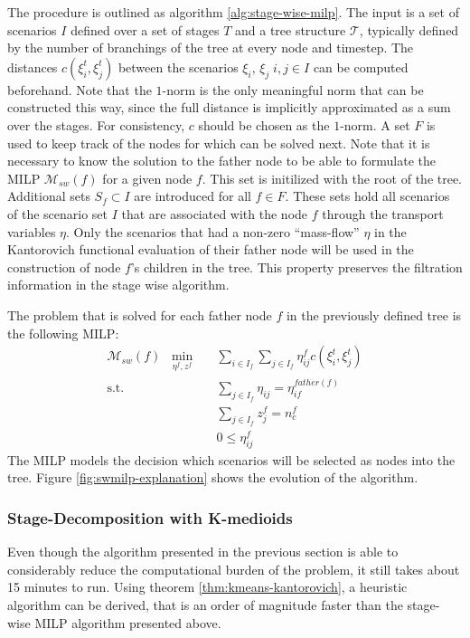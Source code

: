 The procedure is outlined as algorithm \ref{alg:stage-wise-milp}.
The input is a set of scenarios $I$ defined over a set of stages $T$ and a tree structure $\mathcal{T}$, typically defined by the number of branchings of the tree at every node and timestep.
The distances $c(\xi_i^t, \xi_j^t)$ between the scenarios $\xi_i,\,\xi_j\; i,j\in I$ can be computed beforehand.
Note that the $1$-norm is the only meaningful norm that can be constructed this way, since the full distance is implicitly approximated as a sum over the stages.
For consistency, $c$ should be chosen as the $1$-norm.
A set $F$ is used to keep track of the nodes for which can be solved next. Note that it is necessary to know the solution to the father node to be able to formulate the MILP $\mathcal{M}_{sw}(f)$ for a given node $f$. This set is initilized with the root of the tree. Additional sets $S_f\subset I$ are introduced for all $f\in F$. These sets hold all scenarios of the scenario set $I$ that are associated with the node $f$ through the transport variables $\eta$. Only the scenarios that had a non-zero ``mass-flow'' $\eta$ in the Kantorovich functional evaluation of their father node will be used in the construction of node $f$'s children in the tree. This property preserves the filtration information in the stage wise algorithm.

The problem that is solved for each father node $f$ in the previously defined tree is the following MILP:
\begin{eqnarray}
  \label{eq:small-milp-in-alg}
  \mathcal{M}_{sw}(f)\; \; \min_{\eta^f,z^f}&&\sum_{i\in I_f}\sum_{j\in I_f}\eta_{ij}^fc(\xi_i^t,\xi_j^t)\\
  \mathrm{s.t.}&&\sum_{j\in I_f}\eta_{ij} = \eta_{if}^{father(f)}\\
  &&\sum_{j\in I_f}z_j^f = n_c^f\\
  &&0\leq \eta_{ij}^f
\end{eqnarray}
The MILP models the decision which scenarios will be selected as nodes into the tree. Figure \ref{fig:swmilp-explanation} shows the evolution of the algorithm.
\subsubsection{Stage-Decomposition with K-medioids}
Even though the algorithm presented in the previous section is able to considerably reduce the computational burden of the problem, it still takes about 15 minutes to run. 
Using theorem \ref{thm:kmeans-kantorovich}, a heuristic algorithm can be derived, that is an order of magnitude faster than the stage-wise MILP algorithm presented above.


